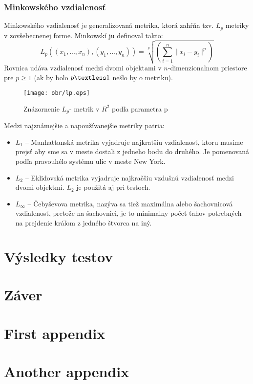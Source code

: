 \documentclass[12pt,oneside]{fithesis2}
\begin{document}
\subsection{Minkowského vzdialenosť}
Minkowského vzdialenosť je generalizovaná metrika, ktorá zahŕňa tzv. $L_p$ metriky v zovšebecnenej forme. Minkowskí ju definoval takto: 
\begin{equation*}
L_p((x_1,...,x_n),(y_1,...,y_n))=\sqrt[p]{(\sum\limits_{i=1}^n \mid x_i-y_i \mid^p )}
\end{equation*}
Rovnica udáva vzdialenosť medzi dvomi objektami v $n$-dimenzionalnom priestore pre $p\geq 1$ (ak by bolo $p \textless 1$ nešlo by o metriku). \\
	\begin{figure}
  		\centering
  		\texttt{[image: obr/lp.eps]}
  		\caption{Znázornenie $L_p$- metrik v $R^2$ podľa parametra p}
  		\label{fig:triangle}
	\end{figure}  

Medzi najznámejšie a napoužívanejšie metriky patria:
\begin{itemize}
\item $L_1$ -- Manhattanská metrika vyjadruje najkratšiu vzdialenosť, ktoru musíme prejsť aby sme sa v meste dostali z jedneho bodu do druhého. Je pomenovaná podľa pravouhélo systému ulíc v meste New York.
\item $L_2$ -- Eklidovská metrika vyjadruje najkračšiu vzdušnú vzdialenosť medzi dvomi objektmi. $L_2$ je použitá aj pri testoch.
\item $L_\infty $ -- Čebyševova metrika, nazýva sa tiež maximálna alebo šachovnicová vzdialenosť, pretože na šachovnici, je to minimalny počet ťahov potrebných na prejdenie kráľom z jedného štvorca na iný.
\end{itemize}



    
    \chapter{Výsledky testov}
    
    \chapter{Záver}

    \chapter{First appendix}        %

    \chapter{Another appendix}

\end{document}
